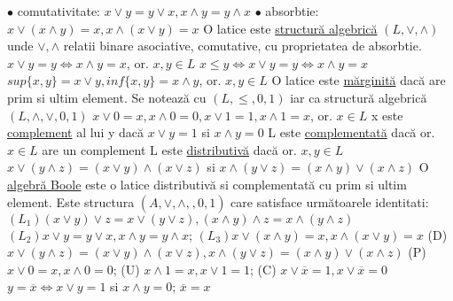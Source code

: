 \documentclass[8pt,twocolumn]{extarticle}
\begin{document}
	$\bullet$ comutativitate: $x \vee y = y \vee x, x \wedge y = y \wedge x$ \newline
	$\bullet$ absorbtie: $x \vee (x \wedge y) = x, x \wedge (x \vee y) = x$ \newline
	O latice este \underline{structură algebrică} $(L, \vee, \wedge)$ unde $\vee, \wedge$ relatii binare asociative, comutative, cu proprietatea de absorbtie. \newline
	$x \vee y = y \Leftrightarrow x \wedge y = x$, or. $x, y \in L$ \newline
	$x \leq y \Leftrightarrow x \vee y = y \Leftrightarrow x \wedge y = x$ \newline
	$sup\{ x, y \} = x \vee y, inf\{ x, y \} = x \wedge y$, or. $x, y \in L$ \newline
	O latice este \underline{mărginită} dacă are prim si ultim element. Se notează cu $(L, \leq, 0, 1)$ iar ca structură algebrică $(L, \wedge, \vee, 0, 1)$ \newline
	$x \vee 0 = x, x \wedge 0 = 0, x \vee 1 = 1, x \wedge 1 = x$, or. $x \in L$ \newline
	x este \underline{complement} al lui y dacă $x \vee y = 1$ si $x \wedge y = 0$ \newline
	L este \underline{complementată} dacă or. $x \in L$ are un complement \newline
	L este \underline{distributivă} dacă or. $x, y \in L$ \newline
	$x \vee (y \wedge z) = (x \vee y) \wedge (x \vee z)$ si $x \wedge (y \vee z) = (x \wedge y) \vee (x \wedge z)$ \newline
	O \underline{algebră Boole} este o latice distributivă si complementată cu prim si ultim element. Este structura $(A, \vee, \wedge, _{ }, 0, 1)$ care satisface următoarele identitati: \newline
	$(L_{1}) (x \vee y) \vee z = x \vee (y \vee z), (x \wedge y) \wedge z = x \wedge (y \wedge z)$ \newline
	$(L_{2}) x \vee y = y \vee x, x \wedge y = y \wedge x$; $(L_{3}) x \vee (x \wedge y) = x, x \wedge (x \vee y) = x$ \newline
	(D) $x \vee (y \wedge z) = (x \vee y) \wedge (x \vee z), x \wedge (y \vee z) = (x \wedge y) \vee (x \wedge z)$ \newline
	(P) $x \vee 0 = x, x \wedge 0 = 0$; (U) $x \wedge 1 = x, x \vee 1 = 1$; (C) $x \vee \overline{x} = 1, x \vee \overline{x} = 0$ \newline
	$y = \overline{x} \Leftrightarrow x \vee y = 1$ si $x \wedge y = 0$; $\overline{x} = x$ \newline
\end{document}
